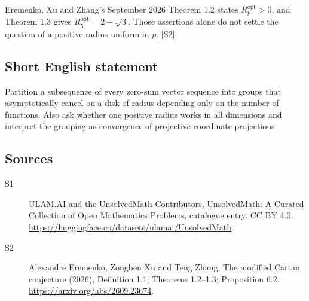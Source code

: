 \documentclass[11pt]{article}
\newcommand{\sref}[2]{\hyperlink{source:#1:#2}{[S#2]}}
\begin{document}
Eremenko, Xu and Zhang's September 2026 Theorem 1.2 states $R_p^{\mathrm{opt}}>0$, and Theorem 1.3 gives $R_5^{\mathrm{opt}}=2-\sqrt3$. Those assertions alone do not settle the question of a positive radius uniform in $p$. \sref{statement}{2}
\subsection{Short English statement}
Partition a subsequence of every zero-sum vector sequence into groups that asymptotically cancel on a disk of radius depending only on the number of functions. Also ask whether one positive radius works in all dimensions and interpret the grouping as convergence of projective coordinate projections.
\subsection{Sources}
\begin{description}
\item[\hypertarget{source:statement:1}{S1}] ULAM.AI and the UnsolvedMath Contributors, UnsolvedMath: A Curated Collection of Open Mathematics Problems, catalogue entry. CC BY 4.0. \url{https://huggingface.co/datasets/ulamai/UnsolvedMath}.
\item[\hypertarget{source:statement:2}{S2}] Alexandre Eremenko, Zongben Xu and Teng Zhang, The modified Cartan conjecture (2026), Definition 1.1; Theorems 1.2–1.3; Proposition 6.2. \url{https://arxiv.org/abs/2609.23674}.
\end{description}
\label{end:statement}
\end{document}
